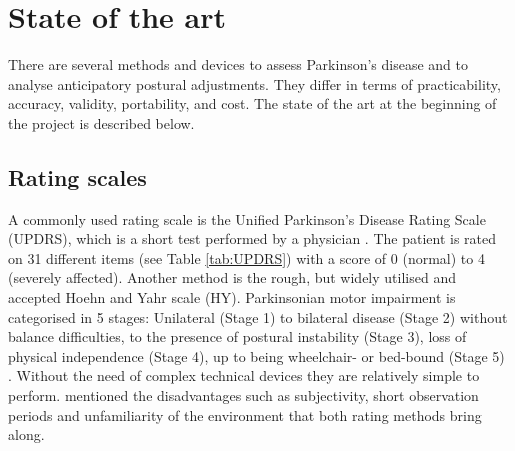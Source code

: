 \section{State of the art}

There are several methods and devices to assess Parkinson's disease and to analyse anticipatory postural adjustments. They differ in terms of practicability, accuracy, validity, portability, and cost. The state of the art at the beginning of the project is described below.

\subsection{Rating scales}

A commonly used rating scale is the Unified Parkinson’s Disease Rating Scale (UPDRS), which is a short test performed by a physician \cite{klerk_long-term_2009}. The patient is rated on 31 different items (see Table \ref{tab:UPDRS}) with a score of 0 (normal) to 4 (severely affected). Another method is the rough, but widely utilised and accepted Hoehn and Yahr scale (HY). Parkinsonian motor impairment is categorised in 5 stages: Unilateral (Stage 1) to bilateral disease (Stage 2) without balance difficulties, to the presence of postural instability (Stage 3), loss of physical independence (Stage 4), up to being wheelchair- or bed-bound (Stage 5) \cite{goetz_movement_2004}. Without the need of complex technical devices they are relatively simple to perform. \citeauthor{klerk_long-term_2009} \cite{klerk_long-term_2009} mentioned the disadvantages such as subjectivity, short observation periods and unfamiliarity of the environment that both rating methods bring along.

